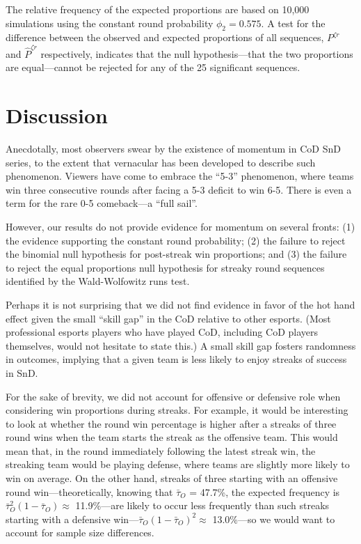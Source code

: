 \documentclass{article}
\begin{document}
The relative frequency of the expected proportions are based on 10,000
simulations using the constant round probability \(\phi_2 = 0.575\). A
test for the difference between the observed and expected proportions of
all sequences, \(P^{\zeta r}\) and \(\hat{P}^{\zeta r}\) respectively,
indicates that the null hypothesis---that the two proportions are
equal---cannot be rejected for any of the 25 significant sequences.

\hypertarget{discussion}{%
\section{Discussion}\label{discussion}}

Anecdotally, most observers swear by the existence of momentum in CoD
SnD series, to the extent that vernacular has been developed to describe
such phenomenon. Viewers have come to embrace the ``5-3'' phenomenon,
where teams win three consecutive rounds after facing a 5-3 deficit to
win 6-5. There is even a term for the rare 0-5 comeback---a ``full
sail''.

However, our results do not provide evidence for momentum on several
fronts: (1) the evidence supporting the constant round probability; (2)
the failure to reject the binomial null hypothesis for post-streak win
proportions; and (3) the failure to reject the equal proportions null
hypothesis for streaky round sequences identified by the Wald-Wolfowitz
runs test.

Perhaps it is not surprising that we did not find evidence in favor of
the hot hand effect given the small ``skill gap'' in the CoD relative to
other esports. (Most professional esports players who have played CoD,
including CoD players themselves, would not hesitate to state this.) A
small skill gap fosters randomness in outcomes, implying that a given
team is less likely to enjoy streaks of success in SnD.

For the sake of brevity, we did not account for offensive or defensive
role when considering win proportions during streaks. For example, it
would be interesting to look at whether the round win percentage is
higher after a streaks of three round wins when the team starts the
streak as the offensive team. This would mean that, in the round
immediately following the latest streak win, the streaking team would be
playing defense, where teams are slightly more likely to win on average.
On the other hand, streaks of three starting with an offensive round
win---theoretically, knowing that \(\bar{\tau}_O\) = 47.7\%, the
expected frequency is \(\bar{\tau}_O^2 (1 - \bar{\tau}_O) \approx\)
11.9\%---are likely to occur less frequently than such streaks starting
with a defensive win---\(\bar{\tau}_O (1 - \bar{\tau}_O)^2 \approx\)
13.0\%---so we would want to account for sample size differences.
\end{document}
